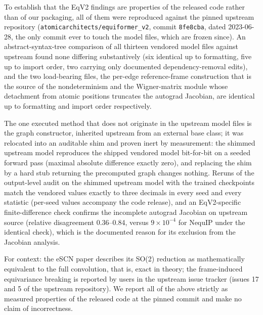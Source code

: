 To establish that the EqV2 findings are properties of the released code rather than of our packaging, all of them were reproduced against the pinned upstream repository (\texttt{atomicarchitects/equiformer\_v2}, commit \texttt{8fe8cba}, dated 2023-06-28, the only commit ever to touch the model files, which are frozen since). An abstract-syntax-tree comparison of all thirteen vendored model files against upstream found none differing substantively (six identical up to formatting, five up to import order, two carrying only documented dependency-removal edits), and the two load-bearing files, the per-edge reference-frame construction that is the source of the nondeterminism and the Wigner-matrix module whose detachment from atomic positions truncates the autograd Jacobian, are identical up to formatting and import order respectively.

The one executed method that does not originate in the upstream model files is the graph constructor, inherited upstream from an external base class; it was relocated into an auditable shim and proven inert by measurement: the shimmed upstream model reproduces the shipped vendored model bit-for-bit on a seeded forward pass (maximal absolute difference exactly zero), and replacing the shim by a hard stub returning the precomputed graph changes nothing. Reruns of the output-level audit on the shimmed upstream model with the trained checkpoints match the vendored values exactly to three decimals in every seed and every statistic (per-seed values accompany the code release), and an EqV2-specific finite-difference check confirms the incomplete autograd Jacobian on upstream source (relative disagreement 0.36--0.84, versus $9\times10^{-4}$ for NequIP under the identical check), which is the documented reason for its exclusion from the Jacobian analysis.

For context: the eSCN paper describes its SO(2) reduction as mathematically equivalent to the full convolution, that is, exact in theory; the frame-induced equivariance breaking is reported by users in the upstream issue tracker (issues 17 and 5 of the upstream repository). We report all of the above strictly as measured properties of the released code at the pinned commit and make no claim of incorrectness.


\label{snote:excluded}\label{snote:hotpp}

